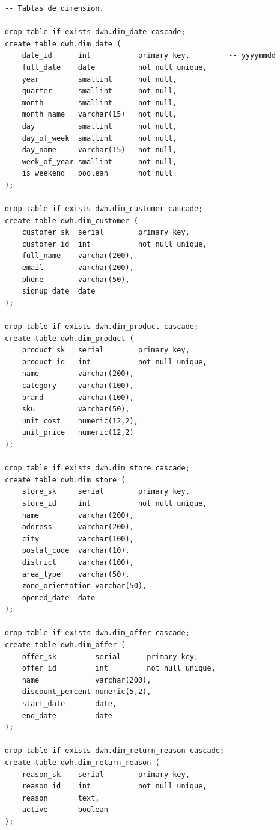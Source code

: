 \begin{lstlisting}[language=SQLpostgres,
  caption={\texttt{sql/02\_dwh\_schema/10\_dim\_tables.sql}: dimensiones
  del DWH.},
  label={lst:ap-dim-tables}]
-- Tablas de dimension.

drop table if exists dwh.dim_date cascade;
create table dwh.dim_date (
    date_id      int           primary key,         -- yyyymmdd
    full_date    date          not null unique,
    year         smallint      not null,
    quarter      smallint      not null,
    month        smallint      not null,
    month_name   varchar(15)   not null,
    day          smallint      not null,
    day_of_week  smallint      not null,
    day_name     varchar(15)   not null,
    week_of_year smallint      not null,
    is_weekend   boolean       not null
);

drop table if exists dwh.dim_customer cascade;
create table dwh.dim_customer (
    customer_sk  serial        primary key,
    customer_id  int           not null unique,
    full_name    varchar(200),
    email        varchar(200),
    phone        varchar(50),
    signup_date  date
);

drop table if exists dwh.dim_product cascade;
create table dwh.dim_product (
    product_sk   serial        primary key,
    product_id   int           not null unique,
    name         varchar(200),
    category     varchar(100),
    brand        varchar(100),
    sku          varchar(50),
    unit_cost    numeric(12,2),
    unit_price   numeric(12,2)
);

drop table if exists dwh.dim_store cascade;
create table dwh.dim_store (
    store_sk     serial        primary key,
    store_id     int           not null unique,
    name         varchar(200),
    address      varchar(200),
    city         varchar(100),
    postal_code  varchar(10),
    district     varchar(100),
    area_type    varchar(50),
    zone_orientation varchar(50),
    opened_date  date
);

drop table if exists dwh.dim_offer cascade;
create table dwh.dim_offer (
    offer_sk         serial      primary key,
    offer_id         int         not null unique,
    name             varchar(200),
    discount_percent numeric(5,2),
    start_date       date,
    end_date         date
);

drop table if exists dwh.dim_return_reason cascade;
create table dwh.dim_return_reason (
    reason_sk    serial        primary key,
    reason_id    int           not null unique,
    reason       text,
    active       boolean
);
\end{lstlisting}

